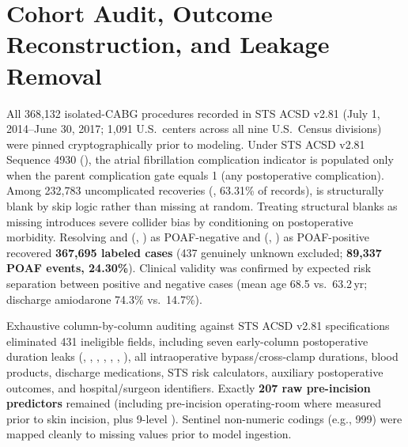 \section{Cohort Audit, Outcome Reconstruction, and Leakage Removal}

All 368,132 isolated-CABG procedures recorded in STS ACSD v2.81 (July 1, 2014--June 30, 2017; 1,091 U.S.\ centers across all nine U.S.\ Census divisions) were pinned cryptographically prior to modeling. Under STS ACSD v2.81 Sequence 4930 (), the atrial fibrillation complication indicator is populated only when the parent complication gate  equals 1 (any postoperative complication).\cite{sts2014v281} Among 232,783 uncomplicated recoveries (, 63.31\% of records),  is structurally blank by skip logic rather than missing at random. Treating structural blanks as missing introduces severe collider bias by conditioning on postoperative morbidity.\cite{hernan2020causal} Resolving  and (, ) as POAF-negative and (, ) as POAF-positive recovered \textbf{367,695 labeled cases} (437 genuinely unknown excluded; \textbf{89,337 POAF events, 24.30\%}). Clinical validity was confirmed by expected risk separation between positive and negative cases (mean age 68.5 vs.\ 63.2\,yr; discharge amiodarone 74.3\% vs.\ 14.7\%).

Exhaustive column-by-column auditing against STS ACSD v2.81 specifications eliminated 431 ineligible fields, including seven early-column postoperative duration leaks (, , , , , , ), all intraoperative bypass/cross-clamp durations, blood products, discharge medications, STS risk calculators, auxiliary postoperative outcomes, and hospital/surgeon identifiers. Exactly \textbf{207 raw pre-incision predictors} remained (including pre-incision operating-room  where measured prior to skin incision, plus 9-level ). Sentinel non-numeric codings (e.g., 999) were mapped cleanly to missing values prior to model ingestion.

